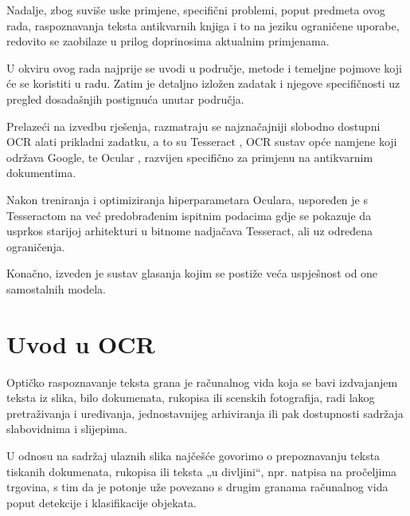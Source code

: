 \documentclass[zavrsnirad]{fer}
\begin{document}
Nadalje, zbog suviše uske primjene, specifični problemi, poput predmeta ovog rada, raspoznavanja teksta antikvarnih knjiga i to na jeziku ograničene uporabe, redovito se zaobilaze u prilog doprinosima aktualnim primjenama. \cite{Olejniczak2022}

U okviru ovog rada najprije se uvodi u područje, metode i temeljne pojmove koji će se koristiti u radu. Zatim je detaljno izložen zadatak i njegove specifičnosti uz pregled dosadašnjih postignuća unutar područja.

Prelazeći na izvedbu rješenja, razmatraju se najznačajniji slobodno dostupni OCR alati prikladni zadatku, a to su Tesseract \cite{Smith2007}, OCR sustav opće namjene koji održava Google, te Ocular \cite{Berg2013}, razvijen specifično za primjenu na antikvarnim dokumentima.

Nakon treniranja i optimiziranja hiperparametara Oculara, uspoređen je s Tesseractom na već predobrađenim ispitnim podacima gdje se pokazuje da usprkos starijoj arhitekturi u bitnome nadjačava Tesseract, ali uz određena ograničenja.

Konačno, izveden je sustav glasanja kojim se postiže veća uspješnost od one samostalnih modela.





\chapter{Uvod u OCR}
\label{pog:ocr_uvod}

Optičko raspoznavanje teksta grana je računalnog vida koja se bavi izdvajanjem teksta iz slika, bilo dokumenata, rukopisa ili scenskih fotografija, radi lakog pretraživanja i uređivanja, jednostavnijeg arhiviranja ili pak dostupnosti sadržaja slabovidnima i slijepima.

U odnosu na sadržaj ulaznih slika najčešće govorimo o prepoznavanju teksta tiskanih dokumenata, rukopisa ili teksta „u divljini“, npr. natpisa na pročeljima trgovina, s tim da je potonje uže povezano s drugim granama računalnog vida poput detekcije i klasifikacije objekata.
\end{document}
